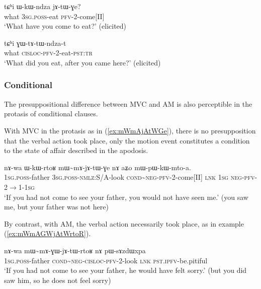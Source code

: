 \documentclass[oneside,a4paper,11pt]{article}
\newcommand{\redp}{\textasciitilde}
\newcommand{\fl}{$\rightarrow$}
\begin{document}
\begin{exe}
\ex \label{ex:tChi.WkWndza}
\gll tɕʰi ɯ-kɯ-ndza jɤ-tɯ-ɣe? \\
what \textsc{3sg.poss}-eat \textsc{pfv}-2-come[II] \\
\glt `What have you come to eat?' (elicited)
\end{exe}

\begin{exe}
\ex \label{ex:tChi.GWtAtWndzat}
\gll tɕʰi ɣɯ-tɤ-tɯ-ndza-t \\
what \textsc{cisloc}-\textsc{pfv}-2-eat-\textsc{pst:tr}    \\
\glt `What did you eat, after you came here?' (elicited)
\end{exe}

\subsubsection{Conditional} \label{sec:am.conditional}
The presuppositional difference between MVC and AM is also perceptible in the protasis of conditional clauses. 

With MVC in the protasis as in (\ref{ex:mWmAjAtWGe}), there is no presupposition that the verbal action took place, only the motion event constitutes a condition to the state of affair described in the apodosis.

\begin{exe}
\ex \label{ex:mWmAjAtWGe}
\gll nɤ-wa ɯ-kɯ-rtoʁ mɯ\redp{}mɤ-jɤ-tɯ-ɣe nɤ aʑo mɯ-pɯ-kɯ-mto-a. \\
\textsc{1sg.poss}-father \textsc{3sg.poss-}\textsc{nmlz}:S/A-look \textsc{cond}\redp{}\textsc{neg}-\textsc{pfv}-2-come[II] \textsc{lnk} \textsc{1sg} \textsc{neg}-\textsc{pfv}-2\fl{}1-\textsc{1sg} \\
\glt `If you had not come to see your father, you would not have seen me.' (you saw me, but your father was not here)
\end{exe}

By contrast, with AM, the verbal action necessarily took place, as in example (\ref{ex:mWmAGWjAtWrtoR}).

\begin{exe}
\ex \label{ex:mWmAGWjAtWrtoR}
\gll nɤ-wa  mɯ\redp{}mɤ-ɣɯ-jɤ-tɯ-rtoʁ nɤ pɯ-sɤzdɯxpa \\
\textsc{1sg.poss}-father \textsc{cond}\redp{}\textsc{neg}-\textsc{cisloc}-\textsc{pfv}-2-look \textsc{lnk} \textsc{pst.ipfv}-be.pitiful \\ 
\glt `If you had not come to see your father, he would have felt sorry.' (but you did saw him, so he does not feel sorry)
\end{exe}
\end{document}
